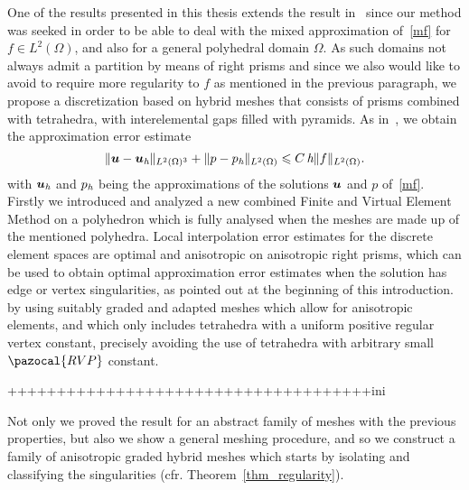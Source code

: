 One of the results presented in this thesis extends
the result in~\cite{MR1866274} since our method was seeked in order to be able 
to deal with the mixed approximation of~\eqref{mf} for $f\in L^2(\Omega)$,
and also for a general polyhedral domain $\Omega$. As such domains not always 
admit a partition by means of right prisms and since 
we also would like to avoid to require more regularity to $f$ as mentioned in 
the previous paragraph, we propose a 
discretization based on hybrid meshes that consists of prisms combined with 
tetrahedra, with 
interelemental gaps filled with pyramids. As in~\cite{MR1866274}, we obtain 
the approximation error estimate
\begin{equation}\label{auxlabel401}
 \|\boldsymbol{u}-\boldsymbol{u}_{\textit h}\|_{L^2(\Omega)^3} + \|p-p_{\textit h}\|_{L^2(\Omega)} 
 \leqslant C\,\textit{h}\|f\|_{L^2(\Omega)}.
\end{equation}
with $\boldsymbol{u}_{\textit h}$ and $p_{\textit h}$ being the approximations of the 
solutions $\boldsymbol{u}$ and $p$ of~\eqref{mf}. Firstly we introduced and analyzed a new 
combined Finite and Virtual 
Element Method on a polyhedron which is fully analysed when the meshes are made 
up of the mentioned polyhedra. Local 
interpolation error estimates for the discrete element spaces are 
optimal and anisotropic on anisotropic right prisms, which can be
used to obtain optimal approximation error estimates when the 
solution has edge or vertex singularities, as pointed out at the beginning of 
this introduction. by using suitably graded and adapted meshes which 
allow for anisotropic elements, and which only includes tetrahedra with a
uniform positive regular vertex constant, precisely avoiding the use of tetrahedra
with arbitrary small $\pazocal{RVP}$ constant.





+++++++++++++++++++++++++++++++++++++ini

Not only we proved the result for an abstract family of meshes with the previous 
properties, but also we show a general meshing procedure, and so we construct
a family of anisotropic graded hybrid meshes which starts by isolating and 
classifying the singularities (cfr. Theorem~\ref{thm_regularity}).

